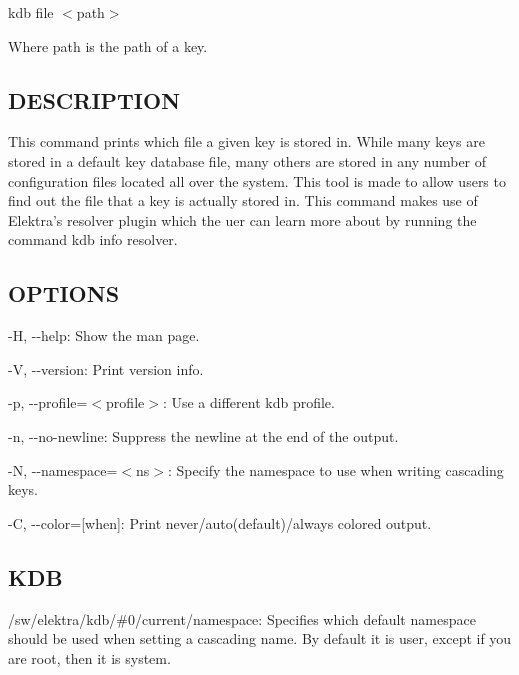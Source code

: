 {\ttfamily kdb file $<$path$>$}

Where {\ttfamily path} is the path of a key.

\subsection*{D\+E\+S\+C\+R\+I\+P\+T\+I\+O\+N}

This command prints which file a given key is stored in. While many keys are stored in a default key database file, many others are stored in any number of configuration files located all over the system. This tool is made to allow users to find out the file that a key is actually stored in. This command makes use of Elektra's {\ttfamily resolver} plugin which the uer can learn more about by running the command {\ttfamily kdb info resolver}.

\subsection*{O\+P\+T\+I\+O\+N\+S}


\begin{DoxyItemize}
\item {\ttfamily -\/\+H}, {\ttfamily -\/-\/help}\+: Show the man page.
\item {\ttfamily -\/\+V}, {\ttfamily -\/-\/version}\+: Print version info.
\item {\ttfamily -\/p}, {\ttfamily -\/-\/profile}=$<$profile$>$\+: Use a different kdb profile.
\item {\ttfamily -\/n}, {\ttfamily -\/-\/no-\/newline}\+: Suppress the newline at the end of the output.
\item {\ttfamily -\/\+N}, {\ttfamily -\/-\/namespace}=$<$ns$>$\+: Specify the namespace to use when writing cascading keys.
\item {\ttfamily -\/\+C}, {\ttfamily -\/-\/color}=\mbox{[}when\mbox{]}\+: Print never/auto(default)/always colored output.
\end{DoxyItemize}

\subsection*{K\+D\+B}


\begin{DoxyItemize}
\item {\ttfamily /sw/elektra/kdb/\#0/current/namespace}\+: Specifies which default namespace should be used when setting a cascading name. By default it is {\ttfamily user}, except if you are root, then it is {\ttfamily system}.
\end{DoxyItemize}

